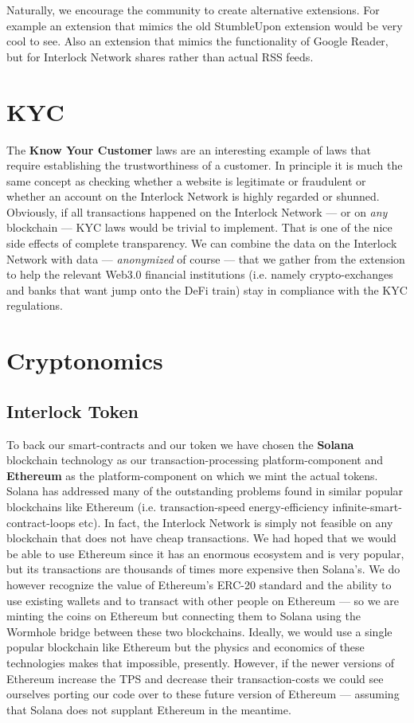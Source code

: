 \documentclass[a4paper]{article}
\begin{document}
Naturally, we encourage the community to create alternative extensions. For example an extension that mimics the old StumbleUpon extension would be very cool to see. Also an extension that mimics the functionality of Google Reader, but for Interlock Network shares rather than actual RSS feeds.
\section{KYC}
\label{KYC}

The \textbf{Know Your Customer} laws are an interesting example of laws that require establishing the trustworthiness of a customer. In principle it is much the same concept as checking whether a website is legitimate or fraudulent or whether an account on the Interlock Network is highly regarded or shunned. Obviously, if all transactions happened on the Interlock Network ---  or on \emph{any} blockchain ---  KYC laws would be trivial to implement. That is one of the nice side effects of complete transparency. We can combine the data on the Interlock Network with data ---  \emph{anonymized} of course ---  that we gather from the extension to help the relevant Web3.0 financial institutions (i.e. namely crypto-exchanges and banks that want jump onto the DeFi train) stay in compliance with the KYC regulations.
\section{Cryptonomics}
\label{Cryptonomics}
\subsection{Interlock Token}
\label{Interlock Token}

To back our smart-contracts and our token we have chosen the \textbf{Solana} blockchain technology as our transaction-processing platform-component and \textbf{Ethereum} as the platform-component on which we mint the actual tokens. Solana has addressed many of the outstanding problems found in similar popular blockchains like Ethereum (i.e. transaction-speed energy-efficiency infinite-smart-contract-loops etc). In fact, the Interlock Network is simply not feasible on any blockchain that does not have cheap transactions. We had hoped that we would be able to use Ethereum since it has an enormous ecosystem and is very popular, but its transactions are thousands of times more expensive then Solana's. We do however recognize the value of Ethereum's ERC-20 standard and the ability to use existing wallets and to transact with other people on Ethereum ---  so we are minting the coins on Ethereum but connecting them to Solana using the Wormhole bridge between these two blockchains. Ideally, we would use a single popular blockchain like Ethereum but the physics and economics of these technologies makes that impossible, presently. However, if the newer versions of Ethereum increase the TPS and decrease their transaction-costs we could see ourselves porting our code over to these future version of Ethereum ---  assuming that Solana does not supplant Ethereum in the meantime.
\end{document}
